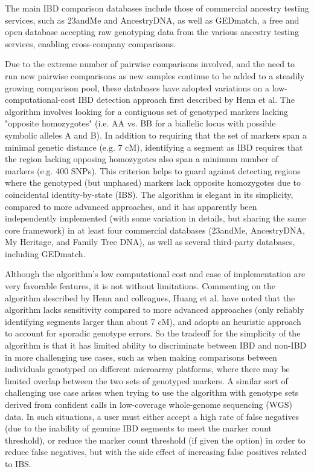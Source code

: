 \documentclass{article}
\begin{document}
The main IBD comparison databases include those of commercial ancestry testing services, such as 23andMe and AncestryDNA, as well as GEDmatch, a free and open database accepting raw genotyping data from the various ancestry testing services, enabling cross-company comparisons.\citep{GEDmatch}

Due to the extreme number of pairwise comparisons involved, and the need to run new pairwise comparisons as new samples continue to be added to a steadily growing comparison pool, these databases have adopted variations on a low-computational-cost IBD detection approach first described by Henn et al.\citep{23andMe} The algorithm involves looking for a contiguous set of genotyped markers lacking "opposite homozygotes" (i.e. AA vs. BB for a biallelic locus with possible symbolic alleles A and B). In addition to requiring that the set of markers span a minimal genetic distance (e.g. 7 cM), identifying a segment as IBD requires that the region lacking opposing homozygotes also span a minimum number of markers (e.g. 400 SNPs). This criterion helps to guard against detecting regions where the genotyped (but unphased) markers lack opposite homozygotes due to coincidental identity-by-state (IBS). The algorithm is elegant in its simplicity, compared to more advanced approaches, and it has apparently been independently implemented (with some variation in details, but sharing the same core framework) in at least four commercial databases (23andMe, AncestryDNA, My Heritage, and Family Tree DNA), as well as several third-party databases, including GEDmatch.

Although the algorithm's low computational cost and ease of implementation are very favorable features, it is not without limitations. Commenting on the algorithm described by Henn and colleagues, Huang et al. have noted that the algorithm lacks sensitivity compared to more advanced approaches (only reliably identifying segments larger than about 7 cM), and adopts an heuristic approach to account for sporadic genotype errors.\citep{speeDB} So the tradeoff for the simplicity of the algorithm is that it has limited ability to discriminate between IBD and non-IBD in more challenging use cases, such as when making comparisons between individuals genotyped on different microarray platforms, where there may be limited overlap between the two sets of genotyped markers. A similar sort of challenging use case arises when trying to use the algorithm with genotype sets derived from confident calls in low-coverage whole-genome sequencing (WGS) data. In such situations, a user must either accept a high rate of false negatives (due to the inability of genuine IBD segments to meet the marker count threshold), or reduce the marker count threshold (if given the option) in order to reduce false negatives, but with the side effect of increasing false positives related to IBS. 
\end{document}
